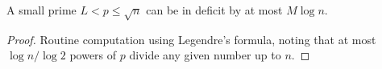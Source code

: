 \begin{sublemma}
\label{initial-factorization-small-prime-ge}
\leanok
A small prime $L < p \leq \sqrt{n}$ can be in deficit by at most
  $M\log n$.
\end{sublemma}
\begin{proof}
\leanok
Routine computation using Legendre's formula, noting that at most
  $\log n / \log 2$ powers of $p$ divide any given number up to $n$.
\end{proof}
